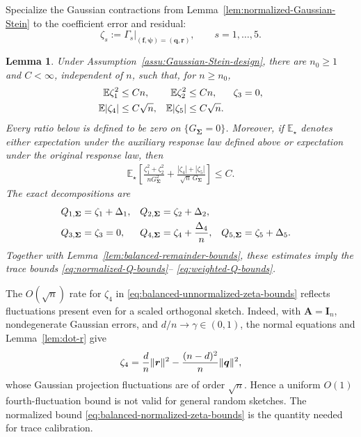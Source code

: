 \documentclass{article}
\theoremstyle{plain}
\newtheorem{lemma}[theorem]{Lemma}
\theoremstyle{definition}
\theoremstyle{definition}
\DeclarePairedDelimiter\norm{\lVert}{\rVert}
\def\E{{\mathbb{E}}}
\def\mathbold{\boldsymbol}
\def\cal{\mathcal}
\def\bA{\mathbold{A}}\def\calA{{\cal A}}\def\scrA{{\mathscr A}}\def\Ahat{\widehat{A}}\def\Atil{{\widetilde A}}
\def\bff{\mathbold{f}}\def\fhat{\widehat{f}}\def\hf{\widehat{f}}\def\ftil{\widetilde{f}}
\def\bI{\mathbold{I}}\def\hbI{{\widehat{\bI}}}\def\tbI{{\widetilde{\bI}}}
\def\bq{\mathbold{q}}\def\qhat{\widehat{q}}\def\qtil{\widetilde{q}}\def\qbar{{\overline q}}
\def\br{\mathbold{r}}\def\rhat{\widehat{r}}\def\rtil{\widetilde{r}}\def\rbar{{\overline r}}
\def\bSigma{\mathbold{\Sigma}}\def\hbSigma{{\widehat{\bSigma}}}
\begin{document}
Specialize the Gaussian contractions from
Lemma~\ref{lem:normalized-Gaussian-Stein} to the coefficient error and residual:
\begin{equation}
    \zeta_s:=\left.\Gamma_s\right|_{(\bff,\boldsymbol\psi)=(\bq,\br)},
    \qquad s=1,\ldots,5.
    \label{eq:zeta-definitions}
\end{equation}

\begin{lemma}
\label{lem:balanced-trace-Stein-bounds}
Under Assumption~\ref{assu:Gaussian-Stein-design},
there are $n_0\geq1$ and $C<\infty$, independent of $n$, such that, for
$n\geq n_0$,
\begin{align}
    \E\zeta_1^2&\leq Cn,
    & \E\zeta_2^2&\leq Cn,
    & \zeta_3&=0,\notag\\
    \E|\zeta_4|&\leq C\sqrt n,
    & \E|\zeta_5|&\leq C\sqrt n.
    \label{eq:balanced-unnormalized-zeta-bounds}
\end{align}
Every ratio below is defined to be zero on $\{G_{\bSigma}=0\}$.
Moreover, if $\E_\star$ denotes either expectation under the auxiliary
response law defined above
or expectation under
the original response law, then
\begin{align}
    \E_\star\left[
       \frac{\zeta_1^2+\zeta_2^2}
            {nG_{\bSigma}^2}
       +\frac{|\zeta_4|+|\zeta_5|}
            {\sqrt n\,G_{\bSigma}}
    \right]\leq C.
    \label{eq:balanced-normalized-zeta-bounds}
\end{align}
The exact decompositions are
\begin{align}
    Q_{1,\bSigma}&=\zeta_1+\Delta_1,
    & Q_{2,\bSigma}&=\zeta_2+\Delta_2,\notag\\
    Q_{3,\bSigma}&=\zeta_3=0,
    & Q_{4,\bSigma}&=\zeta_4+\frac{\Delta_4}{n},
    & Q_{5,\bSigma}&=\zeta_5+\Delta_5.
    \label{eq:balanced-Q-zeta-Delta}
\end{align}
Together with Lemma~\ref{lem:balanced-remainder-bounds}, these estimates imply
the trace bounds \eqref{eq:normalized-Q-bounds}--
\eqref{eq:weighted-Q-bounds}.
\end{lemma}

The $O(\sqrt n)$ rate for $\zeta_4$ in
\eqref{eq:balanced-unnormalized-zeta-bounds} reflects fluctuations present
even for a scaled orthogonal sketch. Indeed, with $\bA=\bI_n$, nondegenerate
Gaussian errors, and $d/n\to\gamma\in(0,1)$, the normal equations and
Lemma~\ref{lem:dot-r} give
\begin{align*}
    \zeta_4
    =\frac dn\norm{\br}^2-\frac{(n-d)^2}{n}\norm{\bq}^2,
\end{align*}
whose Gaussian projection fluctuations are of order $\sqrt n$.  Hence a
uniform $O(1)$ fourth-fluctuation bound is not valid for general random
sketches.  The normalized bound
\eqref{eq:balanced-normalized-zeta-bounds} is the quantity needed for trace
calibration.
\end{document}

